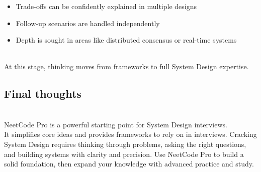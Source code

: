 \begin{itemize}
\item
\protect{}\label{2kTbgbUxfwsOUCetONK6W}
Trade-offs can be confidently explained in multiple designs
\item
\protect{}\label{7-tUHmxPp_fnrLqyYk_8j}
Follow-up scenarios are handled independently
\item
\protect{}\label{s8LsZo7cwYoQ6mqOrO5_L}
Depth is sought in areas like distributed consensus or real-time systems
\end{itemize}
\\
At this stage, thinking moves from frameworks to full System Design expertise.

\subsection{Final thoughts}\label{8GR2oqtMvSqlI6WRIGNx_}
\\
NeetCode Pro is a powerful starting point for System Design interviews.
\\
It simplifies core ideas and provides frameworks to rely on in interviews. Cracking System Design requires thinking through problems, asking the right questions, and building systems with clarity and precision. Use
NeetCode Pro to build a solid foundation, then expand your knowledge with advanced practice and study.

